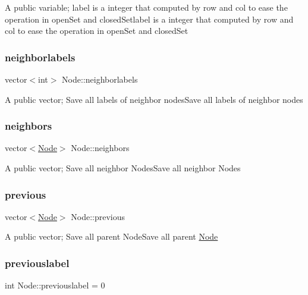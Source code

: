 A public variable; label is a integer that computed by row and col to ease the operation in open\+Set and closed\+Setlabel is a integer that computed by row and col to ease the operation in open\+Set and closed\+Set \mbox{\label{classNode_a85bbcd7c4153edd6075b2f3547633ae1}} 
\subsubsection{\texorpdfstring{neighborlabels}{neighborlabels}}
{\footnotesize\ttfamily vector$<$int$>$ Node\+::neighborlabels}

A public vector; Save all labels of neighbor nodes\+Save all labels of neighbor nodes \mbox{\label{classNode_a11950d219110a00069a2135d8815b2d9}} 
\subsubsection{\texorpdfstring{neighbors}{neighbors}}
{\footnotesize\ttfamily vector$<$\hyperlink{classNode}{Node}$>$ Node\+::neighbors}

A public vector; Save all neighbor Nodes\+Save all neighbor Nodes \mbox{\label{classNode_aa0ce37b5ddcc3dca47ce94f9a9b580fb}} 
\subsubsection{\texorpdfstring{previous}{previous}}
{\footnotesize\ttfamily vector$<$\hyperlink{classNode}{Node}$>$ Node\+::previous}

A public vector; Save all parent Node\+Save all parent \hyperlink{classNode}{Node} \mbox{\label{classNode_acf96db5e58c9826e10c4c07b2dd70113}} 
\subsubsection{\texorpdfstring{previouslabel}{previouslabel}}
{\footnotesize\ttfamily int Node\+::previouslabel = 0}

